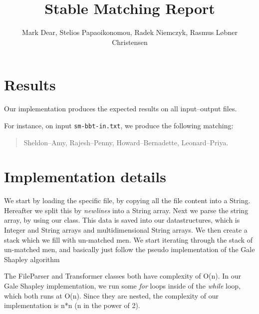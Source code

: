 \documentclass{tufte-handout}
\title{Stable Matching Report}
\author{Mark Dear, Stelios Papaoikonomou, Radek Niemczyk, Rasmus Løbner Christensen}
\begin{document}
  \maketitle

  \section{Results}

  Our implementation produces the expected results on all input--output files.
 
  For instance, on input {\tt sm-bbt-in.txt}, we produce the following matching:
  \begin{quotation}
    Sheldon--Amy, Rajesh--Penny, Howard--Bernadette, Leonard--Priya.
  \end{quotation}

  \section{Implementation details}
  
  We start by loading the specific file, by copying all the file content into a String. Hereafter we split this by \textit{newlines} into a String array.
  Next we parse the string array, by using our class. This data is saved into our datastructures, which is Integer and
  String arrays and multidimensional String arrays. We then create a stack which we fill with un-matched men.
  We start iterating through the stack of un-matched men, and basically just follow the pseudo implementation of the Gale Shapley algorithm 
  
  The FileParser and Transformer classes both have complexity of O(n). In our Gale Shapley implementation, we run some \textit{for} loops inside of the \textit{while} loop,
  which both runs at O(n). Since they are nested, the complexity of our implementation is n*n (n in the power of 2). 
\end{document}
